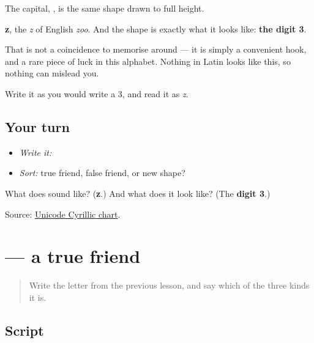 The capital, \textbf{}, is the same shape drawn to full height.

\textbf{z}, the \emph{z} of English \emph{zoo}. And the shape is exactly what it looks like: \textbf{the digit 3}.

That is not a coincidence to memorise around — it is simply a convenient hook, and a rare piece of luck in this alphabet. Nothing in Latin looks like this, so nothing can mislead you.

Write it as you would write a 3, and read it as \emph{z}.

\subsection*{Your turn}
\begin{itemize}
\raggedright
  \item \emph{Write it:} 
  \item \emph{Sort:} true friend, false friend, or new shape?
\end{itemize}

\begin{tcolorbox}[breakable,colback=teal!4,colframe=teal!35!black,title={Before you move on}]
What does \textbf{} sound like? (\textbf{z}.) And what does it look like? (The \textbf{digit 3}.)

Source: \href{https://www.unicode.org/charts/PDF/U0400.pdf}{Unicode Cyrillic chart}.
\end{tcolorbox}
\section[\texorpdfstring{\ru{к} (k)}{к (k)}]{ — a true friend}

\label{lesson:RU-W06-k}



\begin{quote}
Write the letter from the previous lesson, and say which of the three kinds it is.
\end{quote}

\subsection*{Script}

\begin{quote}
   
\end{quote}

